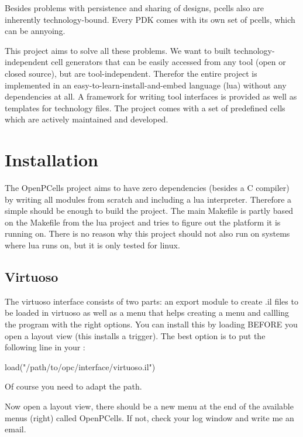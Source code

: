 Besides problems with persistence and sharing of designs, pcells also are inherently technology-bound. Every PDK comes with its own set of pcells, which can be
annyoing.

This project aims to solve all these problems. We want to built technology-independent cell generators that can be easily accessed from any tool (open or closed
source), but are tool-independent. Therefor the entire project is implemented in an easy-to-learn-install-and-embed language (lua) without any dependencies at all. A
framework for writing tool interfaces is provided as well as templates for technology files. The project comes with a set of predefined cells which are actively
maintained and developed.

\section{Installation}
The OpenPCells project aims to have zero dependencies (besides a C compiler) by writing all modules from scratch and including a lua interpreter. Therefore a
simple  should be enough to build the project. The main Makefile is partly based on the Makefile from the lua project and tries to figure out
the platform it is running on. There is no reason why this project should not also run on systems where lua runs on, but it is only tested for linux.

\subsection{Virtuoso}
The virtuoso interface consists of two parts: an export module to create .il files to be loaded in virtuoso as well as a menu that helps creating a menu and
callling the program with the right options. You can install this by loading  BEFORE you open a layout view (this
installs a trigger). The best option is to put the following line in your :
\begin{shellcode}
    load("/path/to/opc/interface/virtuoso.il")
\end{shellcode}
Of course you need to adapt the path.

Now open a layout view, there should be a new menu at the end of the available menus (right) called OpenPCells. If not, check your log window and write me an
email.




